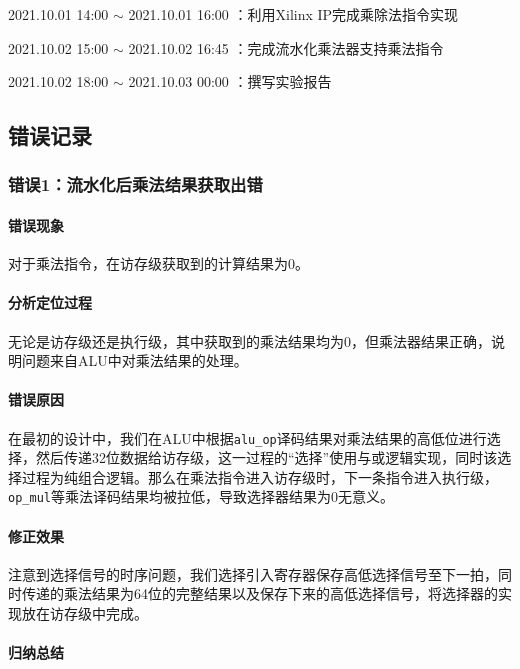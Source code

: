 \documentclass[UTF-8,twoside,c5size]{ctexart}
\begin{document}
	2021.10.01 14:00 $\sim$ 2021.10.01 16:00 ：利用Xilinx IP完成乘除法指令实现
	
	2021.10.02 15:00 $\sim$ 2021.10.02 16:45 ：完成流水化乘法器支持乘法指令
	
	2021.10.02 18:00 $\sim$ 2021.10.03 00:00 ：撰写实验报告
	
	\subsection{错误记录}	
	\subsubsection{错误\textbf{1：}流水化后乘法结果获取出错}
	\paragraph{错误现象}\hfill
	
	
	对于乘法指令，在访存级获取到的计算结果为0。
	
	\paragraph{分析定位过程}\hfill
	
	无论是访存级还是执行级，其中获取到的乘法结果均为0，但乘法器结果正确，说明问题来自ALU中对乘法结果的处理。
	
	\paragraph{错误原因}\hfill
	
	在最初的设计中，我们在ALU中根据\texttt{alu\_op}译码结果对乘法结果的高低位进行选择，然后传递32位数据给访存级，这一过程的“选择”使用与或逻辑实现，同时该选择过程为纯组合逻辑。那么在乘法指令进入访存级时，下一条指令进入执行级，\texttt{op\_mul}等乘法译码结果均被拉低，导致选择器结果为0无意义。
	
	\paragraph{修正效果}\hfill
	
	注意到选择信号的时序问题，我们选择引入寄存器保存高低选择信号至下一拍，同时传递的乘法结果为64位的完整结果以及保存下来的高低选择信号，将选择器的实现放在访存级中完成。
			
	\paragraph{归纳总结}\hfill
			
\end{document}
